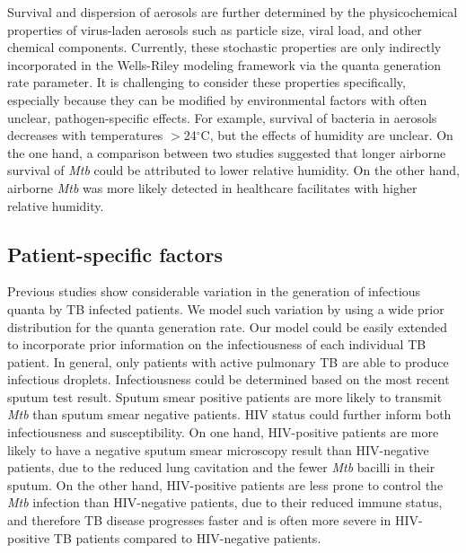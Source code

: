 \documentclass[fleqn,11pt]{wlscirep_supp}
\begin{document}
Survival and dispersion of aerosols are further determined by the physicochemical properties of virus-laden aerosols such as particle size, viral load, and other chemical components\cite{Wang2021Science}. Currently, these stochastic properties are only indirectly incorporated in the Wells-Riley modeling framework via the quanta generation rate parameter\cite{Riley1978AJE,Rudnick2003IndoorAir}. It is challenging to consider these properties specifically, especially because they can be modified by environmental factors with often unclear, pathogen-specific effects\cite{Songer1967,Chan2011AdvVir,Fernstrom2013JoP,Cox1995Book,Fernstrom2013JoP,Tang2009Interface}. For example, survival of bacteria in aerosols decreases with temperatures $>$24$^{\circ}$C, but the effects of humidity are unclear\cite{Tang2009Interface}. On the one hand, a comparison between two studies suggested that longer airborne survival of \emph{Mtb} could be attributed to lower relative humidity\cite{Loudon1969AMRRD,Lever2000LettersAppliedMicrobio}. On the other hand, airborne \emph{Mtb} was more likely detected in healthcare facilitates with higher relative humidity\cite{Sornboot2019IJTLD,Matuka2021IJERP}.   

\subsection{Patient-specific factors}

Previous studies show considerable variation in the generation of infectious quanta by TB infected patients\cite{Escombe2008PLoSMed,Andrews2014JID}. We model such variation by using a wide prior distribution for the quanta generation rate. Our model could be easily extended to incorporate prior information on the infectiousness of each individual TB patient. In general, only patients with active pulmonary TB are able to produce infectious droplets\cite{Rieder1999}. Infectiousness could be determined based on the most recent sputum test result. Sputum smear positive patients are more likely to transmit \emph{Mtb} than sputum smear negative patients\cite{Shaw1954ART,Brindle1993AMRRD,Grzybowski1975BIUT}. HIV status could further inform both infectiousness and susceptibility. On one hand, HIV-positive patients are more likely to have a negative sputum smear microscopy result than HIV-negative patients, due to the reduced lung cavitation and the fewer \emph{Mtb} bacilli in their sputum\cite{Brindle1993AMRRD,Telzak1997CID}. On the other hand, HIV-positive patients are less prone to control the \emph{Mtb} infection than HIV-negative patients, due to their reduced immune status\cite{Forte1992AIDS,Kwan2011CMR,Shen1988CEI}, and therefore TB disease progresses faster and is often more severe in HIV-positive TB patients compared to HIV-negative patients. 
\end{document}
